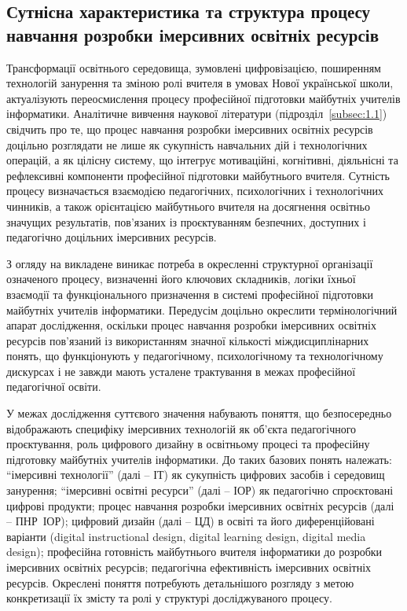 \subsection{Сутнісна характеристика та структура процесу навчання розробки імерсивних освітніх ресурсів}\label{subsec:1.2}

Трансформації освітнього середовища, зумовлені цифровізацією, поширенням технологій занурення та зміною ролі вчителя в умовах Нової української школи, актуалізують переосмислення процесу професійної підготовки майбутніх учителів інформатики. Аналітичне вивчення наукової літератури (підрозділ~\ref{subsec:1.1}) свідчить про те, що процес навчання розробки імерсивних освітніх ресурсів доцільно розглядати не лише як сукупність навчальних дій і технологічних операцій, а як цілісну систему, що інтегрує мотиваційні, когнітивні, діяльнісні та рефлексивні компоненти професійної підготовки майбутнього вчителя. Сутність процесу визначається взаємодією педагогічних, психологічних і технологічних чинників, а також орієнтацією майбутнього вчителя на досягнення освітньо значущих результатів, пов'язаних із проєктуванням безпечних, доступних і педагогічно доцільних імерсивних ресурсів.

З огляду на викладене виникає потреба в окресленні структурної організації означеного процесу, визначенні його ключових складників, логіки їхньої взаємодії та функціонального призначення в системі професійної підготовки майбутніх учителів інформатики. Передусім доцільно окреслити термінологічний апарат дослідження, оскільки процес навчання розробки імерсивних освітніх ресурсів пов'язаний із використанням значної кількості міждисциплінарних понять, що функціонують у педагогічному, психологічному та технологічному дискурсах і не завжди мають усталене трактування в межах професійної педагогічної освіти.

У межах дослідження суттєвого значення набувають поняття, що безпосередньо відображають специфіку імерсивних технологій як об'єкта педагогічного проєктування, роль цифрового дизайну в освітньому процесі та професійну підготовку майбутніх учителів інформатики. До таких базових понять належать: ``імерсивні технології'' (далі -- ІТ) як сукупність цифрових засобів і середовищ занурення; ``імерсивні освітні ресурси'' (далі -- ІОР) як педагогічно спроєктовані цифрові продукти; процес навчання розробки імерсивних освітніх ресурсів (далі -- ПНР~ІОР); цифровий дизайн (далі -- ЦД) в освіті та його диференційовані варіанти (digital instructional design, digital learning design, digital media design); професійна готовність майбутнього вчителя інформатики до розробки імерсивних освітніх ресурсів; педагогічна ефективність імерсивних освітніх ресурсів. Окреслені поняття потребують детальнішого розгляду з метою конкретизації їх змісту та ролі у структурі досліджуваного процесу.

